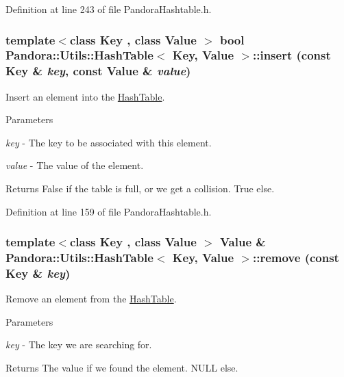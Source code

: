 Definition at line 243 of file PandoraHashtable.h.\hypertarget{classPandora_1_1Utils_1_1HashTable_a57a06b0dde67656b86fd91c04e9a4fbf}{
\subsubsection[{insert}]{\setlength{\rightskip}{0pt plus 5cm}template$<$class Key , class Value $>$ bool {\bf Pandora::Utils::HashTable}$<$ Key, Value $>$::insert (const Key \& {\em key}, \/  const Value \& {\em value})}}
\label{classPandora_1_1Utils_1_1HashTable_a57a06b0dde67656b86fd91c04e9a4fbf}


Insert an element into the \hyperlink{classPandora_1_1Utils_1_1HashTable}{HashTable}. 
\begin{DoxyParams}{Parameters}
\item[{\em key}]-\/ The key to be associated with this element. \item[{\em value}]-\/ The value of the element. \end{DoxyParams}
\begin{DoxyReturn}{Returns}
False if the table is full, or we get a collision. True else. 
\end{DoxyReturn}


Definition at line 159 of file PandoraHashtable.h.\hypertarget{classPandora_1_1Utils_1_1HashTable_ad5c2861d3938bb8e6e4b21bbf7fde6df}{
\subsubsection[{remove}]{\setlength{\rightskip}{0pt plus 5cm}template$<$class Key , class Value $>$ Value \& {\bf Pandora::Utils::HashTable}$<$ Key, Value $>$::remove (const Key \& {\em key})}}
\label{classPandora_1_1Utils_1_1HashTable_ad5c2861d3938bb8e6e4b21bbf7fde6df}


Remove an element from the \hyperlink{classPandora_1_1Utils_1_1HashTable}{HashTable}. 
\begin{DoxyParams}{Parameters}
\item[{\em key}]-\/ The key we are searching for. \end{DoxyParams}
\begin{DoxyReturn}{Returns}
The value if we found the element. NULL else. 
\end{DoxyReturn}


